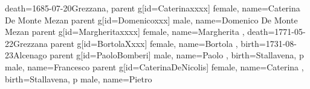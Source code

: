 \documentclass{article}
\begin{document}
\begin{midpage}
\begin{center}
\begin{genealogypicture}
{{{{{{{{{{{{                                                death={1685-07-20}{Grezzana},
                                            }
                                        }
                                    }
                                    parent{
                                        g[id=Caterinaxxxx]{
                                            female,
                                            name={Caterina De Monte Mezan}
                                        }
                                        parent{
                                            g[id=Domenicoxxx]{
                                                male,
                                                name={Domenico De Monte Mezan}
                                            }
                                        }
                                    }
                                }
                                parent{
                                    g[id=Margheritaxxxx]{
                                        female,
                                        name={Margherita },
                                        death={1771-05-22}{Grezzana}
                                    }
                                }
                            }
                            parent{
                                g[id=BortolaXxxx]{
                                    female,
                                    name={Bortola },
                                    birth={1731-08-23}{Alcenago}
                                }
                                parent{
                                    g[id=PaoloBomberi]{
                                        male,
                                        name={Paolo },
                                        birth={Stallavena}{},
                                    }
                                    p{
                                        male,
                                        name={Francesco }
                                    }
                                }
                                parent{
                                    g[id=CaterinaDeNicolis] {
                                        female,
                                        name={Caterina },
                                        birth={Stallavena}{},
                                    }
                                    p{
                                        male,
                                        name={Pietro }
                                    }
}}}}}}}}}
\end{genealogypicture}
\end{center}
\end{midpage}
\end{document}
